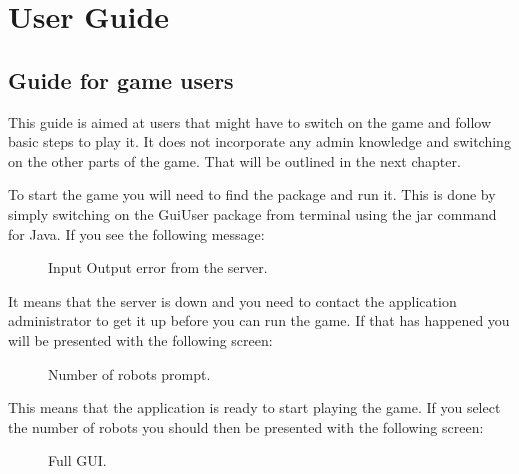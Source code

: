 \chapter{User Guide}
	\section{Guide for game users}
	This guide is aimed at users that might have to switch on the game and follow basic steps to play it. It does not incorporate any admin knowledge and switching on the other parts of the game. That will be outlined in the next chapter.

	To start the game you will need to find the package and run it. This is done by simply switching on the GuiUser package from terminal using the jar command for Java. If you see the following message: 

	\begin{figure}[htp]
		\centering
		\caption{Input Output error from the server.}
	\end{figure}

	It means that the server is down and you need to contact the application administrator to get it up before you can run the game. If that has happened you will be presented with the following screen:

	\begin{figure}[htp]
		\centering
		\caption{Number of robots prompt.}
	\end{figure}

	This means that the application is ready to start playing the game. If you select the number of robots you should then be presented with the following screen:

	\begin{figure}[htp]
		\centering
		\caption{Full GUI.}
	\end{figure}

